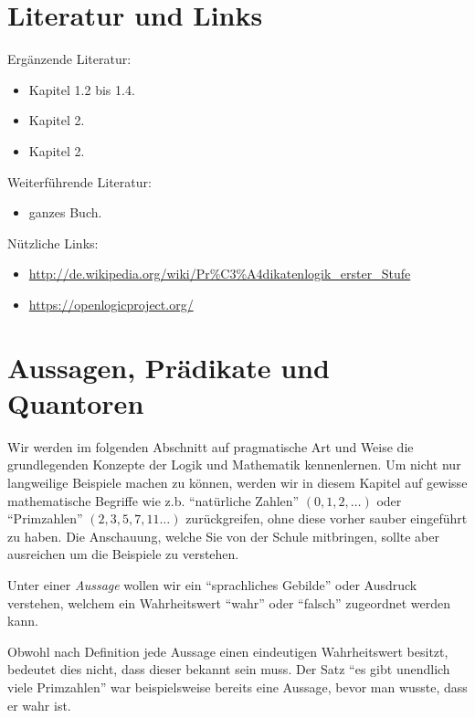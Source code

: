 \section*{Literatur und Links}
Ergänzende Literatur:
\begin{itemize}
\item  \cite{diskreteStrukturen} Kapitel 1.2 bis 1.4.
\item \cite{hartmann} Kapitel 2.
\item \cite{haggarty} Kapitel 2.
\end{itemize}
Weiterführende Literatur:
\begin{itemize}
\item \cite{flum} ganzes Buch.
\end{itemize}
Nützliche Links:
\begin{itemize}
\item \url{http://de.wikipedia.org/wiki/Pr%C3%A4dikatenlogik_erster_Stufe}
\item \url{https://openlogicproject.org/}
\end{itemize}

\section{Aussagen, Prädikate und Quantoren}

Wir werden im folgenden Abschnitt auf pragmatische Art und Weise die grundlegenden Konzepte der
Logik und Mathematik
kennenlernen. Um nicht nur langweilige Beispiele machen zu können, werden wir in diesem Kapitel auf
gewisse mathematische Begriffe wie z.b. ``natürliche Zahlen'' $(0,1,2,\dots)$ oder
``Primzahlen'' $(2,3,5,7,11\dots)$  zurückgreifen, ohne diese vorher sauber eingeführt zu haben. Die Anschauung,
welche Sie von der Schule mitbringen, sollte aber ausreichen um die Beispiele zu
verstehen.

\begin{df}
 Unter einer \textit{Aussage} wollen wir ein ``sprachliches Gebilde'' oder Ausdruck verstehen, welchem ein Wahrheitswert ``wahr'' oder ``falsch'' zugeordnet werden kann.
\end{df}

\begin{rk}
  Obwohl nach Definition jede Aussage einen eindeutigen Wahrheitswert besitzt, bedeutet dies nicht, dass dieser bekannt sein muss. Der Satz ``es gibt unendlich viele Primzahlen'' war beispielsweise bereits eine Aussage, bevor man wusste, dass er wahr ist.
\end{rk}

